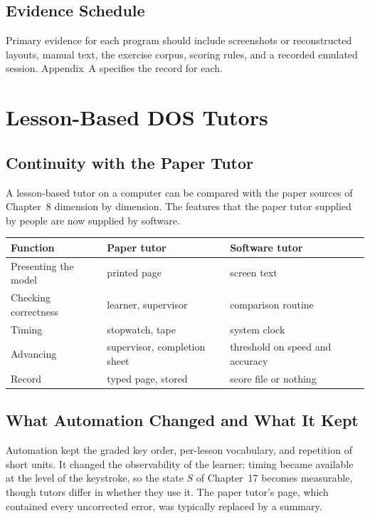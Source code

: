 \section{Evidence Schedule}

Primary evidence for each program should include screenshots or reconstructed layouts, manual text, the exercise corpus, scoring rules, and a recorded emulated session. Appendix~A specifies the record for each.

\chapter{Lesson-Based DOS Tutors}

\section{Continuity with the Paper Tutor}

A lesson-based tutor on a computer can be compared with the paper sources of Chapter~8 dimension by dimension. The features that the paper tutor supplied by people are now supplied by software.

\begin{center}
\begin{tabular}{@{}p{4cm}p{3.5cm}p{4.5cm}@{}}
\toprule
Function & Paper tutor & Software tutor \\
\midrule
Presenting the model & printed page & screen text \\
Checking correctness & learner, supervisor & comparison routine \\
Timing & stopwatch, tape & system clock \\
Advancing & supervisor, completion sheet & threshold on speed and accuracy \\
Record & typed page, stored & score file or nothing \\
\bottomrule
\end{tabular}
\end{center}

\section{What Automation Changed and What It Kept}

Automation kept the graded key order, per-lesson vocabulary, and repetition of short units. It changed the observability of the learner: timing became available at the level of the keystroke, so the state $S$ of Chapter~17 becomes measurable, though tutors differ in whether they use it. The paper tutor's page, which contained every uncorrected error, was typically replaced by a summary.

